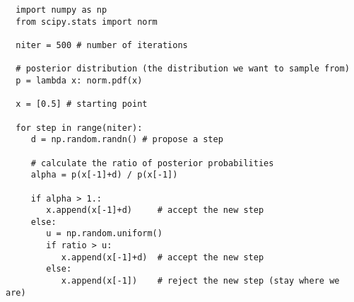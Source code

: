 \documentclass[a4paper,11pt]{article}
\begin{document}
\begin{verbatim}
  import numpy as np
  from scipy.stats import norm
  
  niter = 500 # number of iterations
  
  # posterior distribution (the distribution we want to sample from)
  p = lambda x: norm.pdf(x)
  
  x = [0.5] # starting point
  
  for step in range(niter):
     d = np.random.randn() # propose a step

     # calculate the ratio of posterior probabilities
     alpha = p(x[-1]+d) / p(x[-1])
  
     if alpha > 1.:
        x.append(x[-1]+d)     # accept the new step
     else:
        u = np.random.uniform()
        if ratio > u:
           x.append(x[-1]+d)  # accept the new step
        else:
           x.append(x[-1])    # reject the new step (stay where we are)
\end{verbatim}



\newpage




\end{document}
